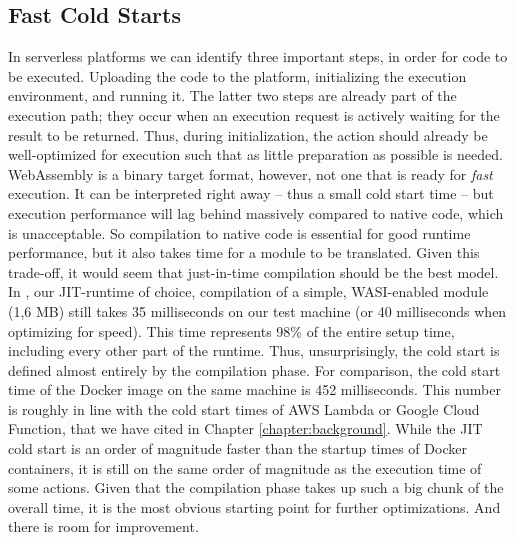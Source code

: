 
\subsection{Fast Cold Starts}
In serverless platforms we can identify three important steps, in order for code to be executed. Uploading the code to the platform, initializing the execution environment, and running it. The latter two steps are already part of the execution path; they occur when an execution request is actively waiting for the result to be returned. Thus, during initialization, the action should already be well-optimized for execution such that as little preparation as possible is needed. WebAssembly is a binary target format, however, not one that is ready for \emph{fast} execution. It can be interpreted right away -- thus a small cold start time -- but execution performance will lag behind massively compared to native code, which is unacceptable. So compilation to native code is essential for good runtime performance, but it also takes time for a module to be translated. Given this trade-off, it would seem that just-in-time compilation should be the best model. In , our JIT-runtime of choice, compilation of a simple, WASI-enabled module (1,6 MB) still takes 35 milliseconds on our test machine (or 40 milliseconds when optimizing for speed). This time represents 98\% of the entire setup time, including every other part of the runtime. Thus, unsurprisingly, the cold start is defined almost entirely by the compilation phase. For comparison, the cold start time of the  Docker image on the same machine is 452 milliseconds. This number is roughly in line with the cold start times of AWS Lambda or Google Cloud Function, that we have cited in Chapter \ref{chapter:background}. While the JIT cold start is an order of magnitude faster than the startup times of Docker containers, it is still on the same order of magnitude as the execution time of some actions. Given that the compilation phase takes up such a big chunk of the overall time, it is the most obvious starting point for further optimizations. And there is room for improvement.

